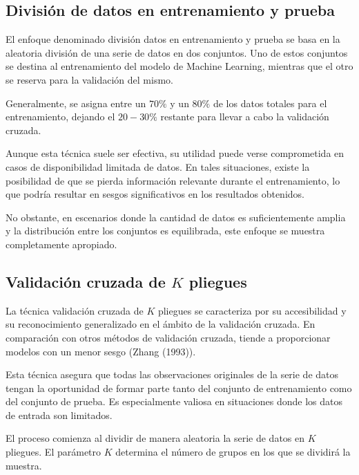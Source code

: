 \documentclass[
  us-letterpaper,
]{scrreprt}
\theoremstyle{definition}
\theoremstyle{plain}
\theoremstyle{plain}
\theoremstyle{definition}
\theoremstyle{remark}
\begin{document}
\subsection{División de datos en entrenamiento y
prueba}\label{divisiuxf3n-de-datos-en-entrenamiento-y-prueba}

El enfoque denominado división datos en entrenamiento y prueba se basa
en la aleatoria división de una serie de datos en dos conjuntos. Uno de
estos conjuntos se destina al entrenamiento del modelo de Machine
Learning, mientras que el otro se reserva para la validación del mismo.

Generalmente, se asigna entre un \(70\%\) y un \(80\%\) de los datos
totales para el entrenamiento, dejando el \(20-30\%\) restante para
llevar a cabo la validación cruzada.

Aunque esta técnica suele ser efectiva, su utilidad puede verse
comprometida en casos de disponibilidad limitada de datos. En tales
situaciones, existe la posibilidad de que se pierda información
relevante durante el entrenamiento, lo que podría resultar en sesgos
significativos en los resultados obtenidos.

No obstante, en escenarios donde la cantidad de datos es suficientemente
amplia y la distribución entre los conjuntos es equilibrada, este
enfoque se muestra completamente apropiado.

\subsection{\texorpdfstring{Validación cruzada de \(K\)
pliegues}{Validación cruzada de K pliegues}}\label{sec-validaciuxf3n-cruzada-de-k-pliegues}

La técnica validación cruzada de \(K\) pliegues se caracteriza por su
accesibilidad y su reconocimiento generalizado en el ámbito de la
validación cruzada. En comparación con otros métodos de validación
cruzada, tiende a proporcionar modelos con un menor sesgo (Zhang
(1993)).

Esta técnica asegura que todas las observaciones originales de la serie
de datos tengan la oportunidad de formar parte tanto del conjunto de
entrenamiento como del conjunto de prueba. Es especialmente valiosa en
situaciones donde los datos de entrada son limitados.

El proceso comienza al dividir de manera aleatoria la serie de datos en
\(K\) pliegues. El parámetro \(K\) determina el número de grupos en los
que se dividirá la muestra.
\end{document}
